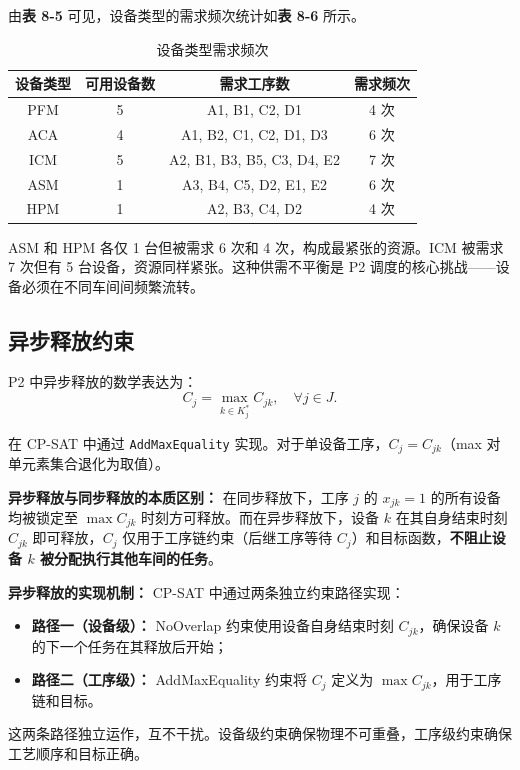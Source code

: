 \documentclass[UTF8,a4paper,12pt]{ctexart}
\begin{document}
由\textbf{表 8-5} 可见，设备类型的需求频次统计如\textbf{表 8-6} 所示。

\begin{table}[htbp]
  \centering
  \caption{设备类型需求频次}
  \label{tab:demand_freq}
  \begin{tabular}{cccc}
    \toprule
    设备类型 & 可用设备数 & 需求工序数 & 需求频次 \\
    \midrule
    PFM & 5 & A1, B1, C2, D1 & 4 次 \\
    ACA & 4 & A1, B2, C1, C2, D1, D3 & 6 次 \\
    ICM & 5 & A2, B1, B3, B5, C3, D4, E2 & 7 次 \\
    ASM & 1 & A3, B4, C5, D2, E1, E2 & 6 次 \\
    HPM & 1 & A2, B3, C4, D2 & 4 次 \\
    \bottomrule
  \end{tabular}
\end{table}

ASM 和 HPM 各仅 1 台但被需求 6 次和 4 次，构成最紧张的资源。ICM 被需求 7 次但有 5 台设备，资源同样紧张。这种供需不平衡是 P2 调度的核心挑战——设备必须在不同车间间频繁流转。

\subsection{异步释放约束}
P2 中异步释放的数学表达为：
\begin{equation}
C_j = \max_{k \in K_j^*} C_{jk}, \quad \forall j \in J. \tag{8-3}
\end{equation}

在 CP-SAT 中通过 \texttt{AddMaxEquality} 实现。对于单设备工序，$C_j = C_{jk}$（max 对单元素集合退化为取值）。

\textbf{异步释放与同步释放的本质区别：} 在同步释放下，工序 $j$ 的 $x_{jk} = 1$ 的所有设备均被锁定至 $\max C_{jk}$ 时刻方可释放。而在异步释放下，设备 $k$ 在其自身结束时刻 $C_{jk}$ 即可释放，$C_j$ 仅用于工序链约束（后继工序等待 $C_j$）和目标函数，\textbf{不阻止设备 $k$ 被分配执行其他车间的任务}。

\textbf{异步释放的实现机制：} CP-SAT 中通过两条独立约束路径实现：
\begin{itemize}
  \item \textbf{路径一（设备级）：} NoOverlap 约束使用设备自身结束时刻 $C_{jk}$，确保设备 $k$ 的下一个任务在其释放后开始；
  \item \textbf{路径二（工序级）：} AddMaxEquality 约束将 $C_j$ 定义为 $\max C_{jk}$，用于工序链和目标。
\end{itemize}
这两条路径独立运作，互不干扰。设备级约束确保物理不可重叠，工序级约束确保工艺顺序和目标正确。
\end{document}
